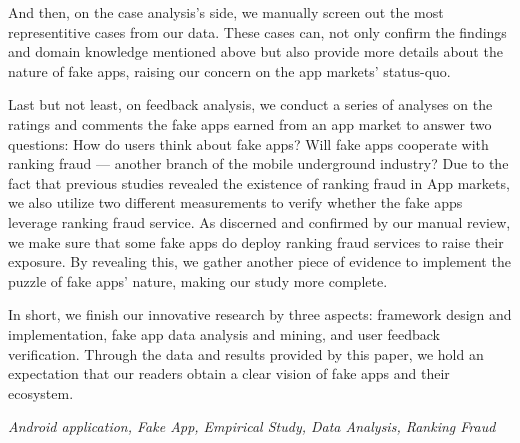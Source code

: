 And then, on the case analysis's side, we manually screen out the most representitive cases from our data.
These cases can, not only confirm the findings and domain knowledge mentioned above but also provide more details about the nature of fake apps, raising our concern on the app markets' status-quo.

Last but not least, on feedback analysis, we conduct a series of analyses on the ratings and comments the fake apps earned from an app market to answer two questions: How do users think about fake apps? Will fake apps cooperate with ranking fraud --- another branch of the mobile underground industry?
Due to the fact that previous studies revealed the existence of ranking fraud in App markets, we also utilize two different measurements to verify whether the fake apps leverage ranking fraud service.
As discerned and confirmed by our manual review, we make sure that some fake apps do deploy ranking fraud services to raise their exposure.
By revealing this, we gather another piece of evidence to implement the puzzle of fake apps' nature, making our study more complete.

In short, we finish our innovative research by three aspects: framework design and implementation, fake app data analysis and mining, and user feedback verification.
Through the data and results provided by this paper, we hold an expectation that our readers obtain a clear vision of fake apps and their ecosystem.

{} \textit{Android application, Fake App, Empirical Study, Data Analysis, Ranking Fraud}
